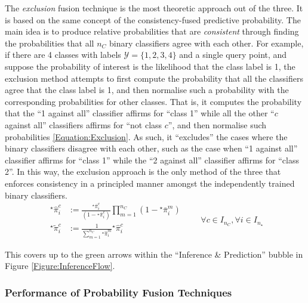				
					The \textit{exclusion} fusion technique is the most theoretic approach out of the three. It is based on the same concept of the consistency-fused predictive probability. The main idea is to produce relative probabilities that are \textit{consistent} through finding the probabilities that all $n_{C}$ binary classifiers agree with each other. For example, if there are 4 classes with labels $\mathcal{Y} = \{1, 2, 3, 4\}$ and a single query point, and suppose the probability of interest is the likelihood that the class label is 1, the exclusion method attempts to first compute the probability that all the classifiers agree that the class label is 1, and then normalise such a probability with the corresponding probabilities for other classes. That is, it computes the probability that the ``1 against all'' classifier affirms for ``class 1'' while all the other ``$c$ against all'' classifiers affirms for ``not class $c$'', and then normalise such probabilities \eqref{Equation:Exclusion}. As such, it ``excludes'' the cases where the binary classifiers disagree with each other, such as the case when ``1 against all'' classifier affirms for ``class 1'' while the ``2 against all'' classifier affirms for ``class 2''. In this way, the exclusion approach is the only method of the three that enforces consistency in a principled manner amongst the independently trained binary classifiers. \begin{equation}
						\begin{aligned}
							{^{\star}}\hat{\pi}^{c}_{i} &:= \frac{{^{\star}}\bar{\pi}^{c}_{i}}{(1 - {^{\star}}\bar{\pi}^{c}_{i})} \prod_{m = 1}^{n_{C}} (1 - {^{\star}}\bar{\pi}^{m}_{i}) \\
							{^{\star}}\tilde{\pi}^{c}_{i} &:= \frac{1}{\sum_{m = 1}^{n_{C}} {^{\star}}\hat{\pi}^{m}_{i}} {^{\star}}\hat{\pi}^{c}_{i} 
						\end{aligned} \qquad \forall c \in I_{n_{C}}, \forall i \in I_{n_{\star}}
					\label{Equation:Exclusion}
					\end{equation}
				
					This covers up to the green arrows within the ``Inference \& Prediction'' bubble in Figure \ref{Figure:InferenceFlow}.
					
			\subsubsection{Performance of Probability Fusion Techniques}
			\label{BenthicHabitatMapping:Classification:FusionPerformance}
				
